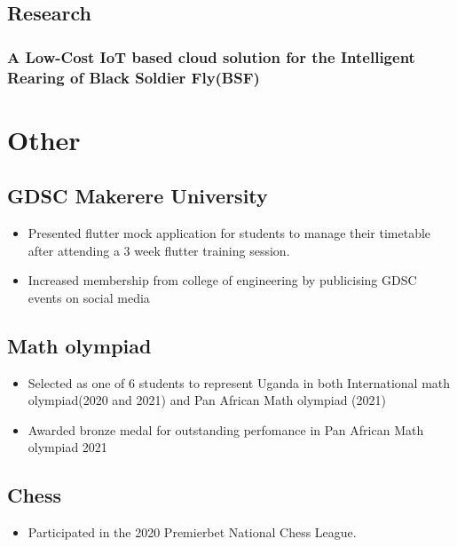 \documentclass[a4paper,twocolumn]{article}
\begin{document}
    
    
    	\subsection*{Research}
    	\subsubsection*{A Low-Cost IoT based cloud solution for the Intelligent Rearing of Black Soldier Fly(BSF)}



        \section*{Other}
        \subsection*{GDSC Makerere University}
        \begin{itemize}
            \item Presented flutter mock application for students to manage their timetable after attending a 3 week flutter training session.
            \item Increased membership from college of engineering by publicising GDSC events on social media
        \end{itemize}

        \subsection*{Math olympiad}
        \begin{itemize}
            \item Selected as one of 6 students to represent Uganda in both International math olympiad(2020 and 2021) and Pan African Math olympiad (2021)
            \item Awarded bronze medal for outstanding perfomance in Pan African Math olympiad 2021
        \end{itemize}

        \subsection*{Chess}
        \begin{itemize}
            \item Participated in the 2020 Premierbet National Chess League.
        \end{itemize}
    
\end{document}
